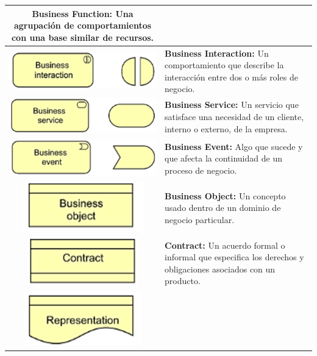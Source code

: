 \begin{longtable}{|c|p{8cm}|}
\textbf{Business Function:} Una agrupación de comportamientos con una base similar de recursos. \\
\hline
\includegraphics{apendices/ARCHI/business/interaction.png} & 
\textbf{Business Interaction:} Un comportamiento que describe la interacción entre dos o más roles de negocio. \\
\hline
\includegraphics{apendices/ARCHI/business/service.png} & 
\textbf{Business Service:} Un servicio que satisface una necesidad de un cliente, interno o externo, de la empresa. \\
\hline
\includegraphics{apendices/ARCHI/business/event.png} & 
\textbf{Business Event:} Algo que sucede y que afecta la continuidad de un proceso de negocio. \\
\hline
\includegraphics{apendices/ARCHI/business/object.png} & 
\textbf{Business Object:} Un concepto usado dentro de un dominio de negocio particular. \\
\hline
\includegraphics{apendices/ARCHI/business/contract.png} & 
\textbf{Contract:} Un acuerdo formal o informal que especifica los derechos y obligaciones asociados con un producto. \\
\hline
\includegraphics{apendices/ARCHI/business/representation.png} & 

\end{longtable}
